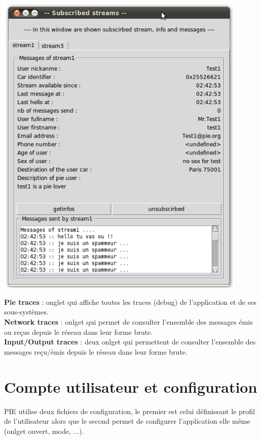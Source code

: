 \begin{center}
    \includegraphics[width=0.9\textwidth]{img/subscribed.png}
\end{center}

\textbf{Pie traces} : onglet qui affiche toutes les traces (debug) de l'application et de ses sous-systèmes.\\

\textbf{Network traces} : onlget qui permet de consulter l'ensemble des messages émis ou reçus depuis le réseau dans leur forme brute.\\

\textbf{Input/Output traces} : deux onlget qui permettent de consulter l'ensemble des messages reçu/émis depuis le réseau dans leur forme brute. \\

\section{Compte utilisateur et configuration}

PIE utilise deux fichiers de configuration, le premier est celui définissant le profil de l'utilisateur
alors que le second permet de configurer l'application elle même (onlget ouvert, mode, ...).  \\

